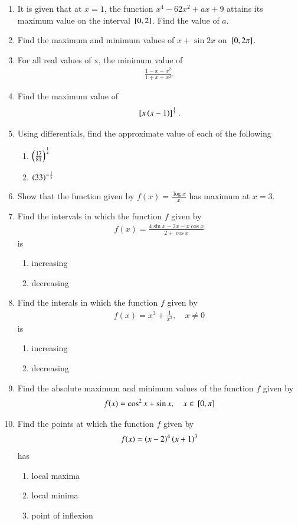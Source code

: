 \begin{enumerate}[label=\arabic*.,ref=\thesubsection.\theenumi]
\item It is given that at $x=1$, the function $x^4-62x^2 + ax+9$ attains its maximum value on the interval ${}\left[0,2\right]$.  Find the value of $a$.
\item Find the maximum and minimum values of $x + \sin 2x$ on ${}\left[0, 2\pi\right]$.
\item For all real values of x, the minimum value of
\begin{align}
\frac{1-x+x^2}{1+x+x^2}.
\end{align}
%
\item Find the maximum value of 
\begin{align}
{}\left[x\left(x-1\right)\right]^{\frac{1}{3}}.
\end{align}
\item Using differentials, find the approximate value of each of the following
%
\begin{enumerate}
\item $\left(\frac{17}{81}\right)^{\frac{1}{4}}$
\item $\left(33\right)^{-\frac{1}{5}}$
\end{enumerate}
%
\item Show that the function given by $f(x) = \frac{\log x}{x}$ has maximum at $x = 3$.
\item Find the intervals in which the function $f$ given by 
%
\begin{align}
f(x)  = \frac{4\sin x-2x - x\cos x}{2+\cos x}
\end{align}
%
is
%
\begin{enumerate}
\item increasing 
\item decreasing 
\end{enumerate}
%
\item Find the interals in which the function $f$ given by 
%
\begin{align}
f(x)  = x^3 + \frac{1}{x^3}, \quad x \ne 0
\end{align}
%
is
\begin{enumerate}
\item increasing 
\item decreasing 
\end{enumerate}
%
\item Find the absolute maximum and minimum values of the function $f$ given by 
%
\begin{align}
f(x)  = \cos^2 x + \sin x , \quad x \in {}\left[0,\pi\right]
\end{align}
%
\item Find the points at which the function $f$ given by 
%
\begin{align}
f(x)  = \left(x-2\right)^4\left(x+1\right)^3
\end{align}
%
has
\begin{enumerate}
\item local maxima
\item local minima
\item point of inflexion
\end{enumerate}
%
\end{enumerate}
